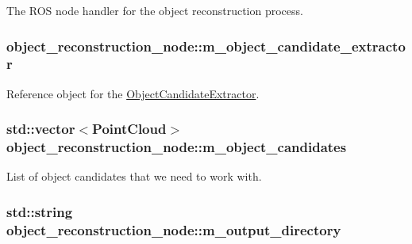 \-The \-R\-O\-S node handler for the object reconstruction process. 

\hypertarget{classobject__reconstruction__node_a5c9dce10dc493b97dff5f1aac13a7501}{
\subsubsection[{m\-\_\-object\-\_\-candidate\-\_\-extractor}]{ {\bf object\-\_\-reconstruction\-\_\-node\-::m\-\_\-object\-\_\-candidate\-\_\-extractor}}}\label{classobject__reconstruction__node_a5c9dce10dc493b97dff5f1aac13a7501}


\-Reference object for the \hyperlink{class_object_candidate_extractor}{\-Object\-Candidate\-Extractor}. 

\hypertarget{classobject__reconstruction__node_a1c2d6c9c999230706a087a87aca78cce}{
\subsubsection[{m\-\_\-object\-\_\-candidates}]{\setlength{\rightskip}{0pt plus 5cm}std\-::vector$<${\bf \-Point\-Cloud}$>$ {\bf object\-\_\-reconstruction\-\_\-node\-::m\-\_\-object\-\_\-candidates}}}\label{classobject__reconstruction__node_a1c2d6c9c999230706a087a87aca78cce}


\-List of object candidates that we need to work with. 

\hypertarget{classobject__reconstruction__node_a4177671d10573e28564ba3945bb05cb5}{
\subsubsection[{m\-\_\-output\-\_\-directory}]{\setlength{\rightskip}{0pt plus 5cm}std\-::string {\bf object\-\_\-reconstruction\-\_\-node\-::m\-\_\-output\-\_\-directory}}}\label{classobject__reconstruction__node_a4177671d10573e28564ba3945bb05cb5}


